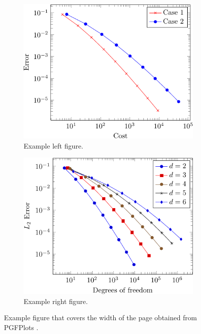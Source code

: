 \documentclass[9pt,a4paper,twoside]{tau-class/tau}
\begin{document}
        \begin{figure}[tp] %
		\centering
		  \begin{subfigure}[b]{0.38\linewidth} %
			\includegraphics[width=\linewidth]{figures/Example2.pdf}
			\caption{Example left figure.}
			\label{fig:figa}
		\end{subfigure}
			\hspace{20pt}   %
		\begin{subfigure}[b]{0.375\linewidth} %
			\includegraphics[width=\linewidth]{figures/Example3.pdf}
			\caption{Example right figure.}
			\label{fig:figb}
		\end{subfigure}
		\caption{Example figure that covers the width of the page obtained from PGFPlots \cite{PFGPlots}.}
		\label{fig:examplefloat}
	\end{figure}
	
\end{document}

